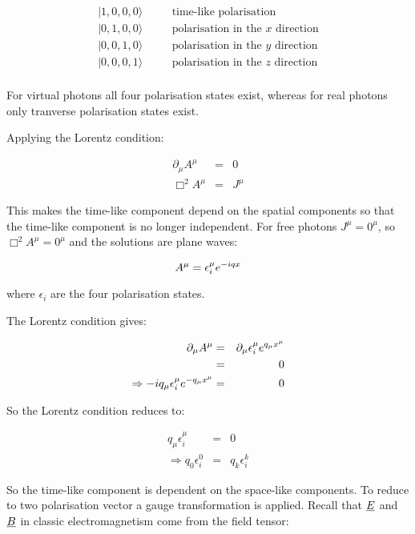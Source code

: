 \begin{eqnarray*}
  |1,0,0,0\rangle & \quad & \textrm{time-like polarisation} \\
  |0,1,0,0\rangle & \quad & \textrm{polarisation in the $x$ direction} \\
  |0,0,1,0\rangle & \quad & \textrm{polarisation in the $y$ direction} \\
  |0,0,0,1\rangle & \quad & \textrm{polarisation in the $z$ direction} \\
\end{eqnarray*}

For virtual photons all four polarisation states exist, whereas for real photons only tranverse polarisation states exist.

Applying the Lorentz condition:

\begin{eqnarray*}
  \partial_{\mu}A^{\mu} & = & 0 \\
  \Box^2A^{\mu} & = & J^{\mu}
\end{eqnarray*}

This makes the time-like component depend on the spatial components so that the time-like component is no longer independent.  For free photons $J^{\mu} = 0^{\mu}$, so $\Box^2A^{\mu} = 0^{\mu}$ and the solutions are plane waves:

\[
  A^{\mu} = \epsilon_i^{\mu}e^{-iqx}
\]

where $\epsilon_i$ are the four polarisation states.

The Lorentz condition gives:

\begin{eqnarray*}
  \partial_{\mu}A^{\mu} & = & \partial_{\mu}\epsilon_i^{\mu}e^{q_{\mu}x^{\mu}} \\
  & = & 0 \\
  \Rightarrow -iq_{\mu}\epsilon_i^{\mu}e^{-q_{\mu}x^{\mu}} & = & 0
\end{eqnarray*}

So the Lorentz condition reduces to:

\begin{eqnarray*}
  q_{\mu}\epsilon_i^{\mu} & = & 0 \\
  \Rightarrow q_0\epsilon_i^0 & = & q_k\epsilon_i^k
\end{eqnarray*}

So the time-like component is dependent on the space-like components.  To reduce to two polarisation vector a gauge transformation is applied.  Recall that $\underline{E}$ and $\underline{B}$ in classic electromagnetism come from the field tensor:

